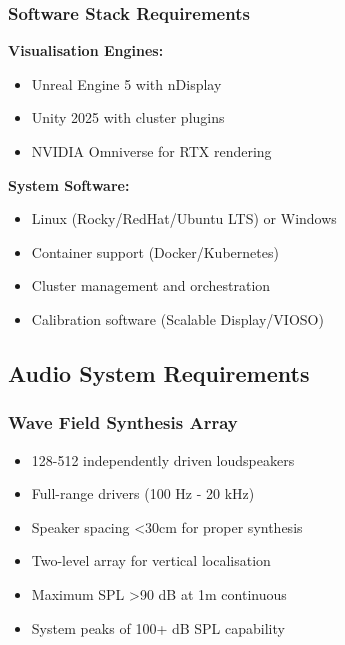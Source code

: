 \subsubsection{Software Stack Requirements}

\textbf{Visualisation Engines:}
\begin{itemize}
    \item Unreal Engine 5 with nDisplay
    \item Unity 2025 with cluster plugins
    \item NVIDIA Omniverse for RTX rendering
\end{itemize}

\textbf{System Software:}
\begin{itemize}
    \item Linux (Rocky/RedHat/Ubuntu LTS) or Windows
    \item Container support (Docker/Kubernetes)
    \item Cluster management and orchestration
    \item Calibration software (Scalable Display/VIOSO)
\end{itemize}

\subsection{Audio System Requirements}

\subsubsection{Wave Field Synthesis Array}

\begin{itemize}
    \item 128-512 independently driven loudspeakers
    \item Full-range drivers (100 Hz - 20 kHz)
    \item Speaker spacing <30cm for proper synthesis
    \item Two-level array for vertical localisation
    \item Maximum SPL >90 dB at 1m continuous
    \item System peaks of 100+ dB SPL capability
\end{itemize}

